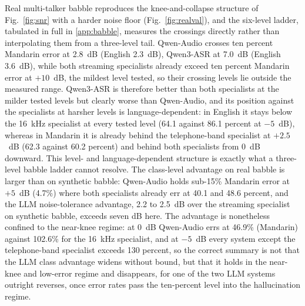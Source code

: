 Real multi-talker babble reproduces the knee-and-collapse structure of
Fig.~\ref{fig:snr} with a harder noise floor
(Fig.~\ref{fig:realval}), and the six-level ladder, tabulated in full in
\ref{app:babble}, measures the crossings
directly rather than interpolating them from a three-level tail. Qwen-Audio
crosses ten percent Mandarin error at 2.8~dB (English 2.3~dB), Qwen3-ASR at
7.0~dB (English 3.6~dB), while both streaming specialists already exceed
ten percent Mandarin error at $+10$~dB, the mildest level tested, so their
crossing levels lie outside the measured range. Qwen3-ASR is therefore
better than both specialists at the milder tested levels but clearly
worse than Qwen-Audio, and its position against the specialists at
harsher levels is language-dependent: in English it stays below the
16~kHz specialist at every tested level (64.1 against 86.1 percent at
$-5$~dB), whereas in Mandarin it is already behind the telephone-band
specialist at $+2.5$~dB (62.3 against 60.2 percent) and behind both
specialists from $0$~dB downward. This level- and language-dependent
structure is exactly what a three-level babble ladder cannot resolve. The
class-level advantage on real
babble is larger than on synthetic babble: Qwen-Audio holds sub-15\%
Mandarin error at $+5$~dB (4.7\%) where both specialists already err at 40.1
and 48.6 percent, and the LLM noise-tolerance advantage, 2.2 to 2.5~dB over
the streaming specialist on synthetic babble, exceeds seven dB here. The
advantage is nonetheless confined to the near-knee regime: at $0$~dB
Qwen-Audio errs at 46.9\% (Mandarin) against 102.6\% for the 16~kHz
specialist, and at $-5$~dB every system except the telephone-band
specialist exceeds
130 percent, so the correct summary is not that the LLM class advantage
widens without bound, but that it holds in the near-knee and low-error
regime and disappears, for one of the two LLM systems outright reverses,
once error rates pass the ten-percent level into the hallucination regime.

